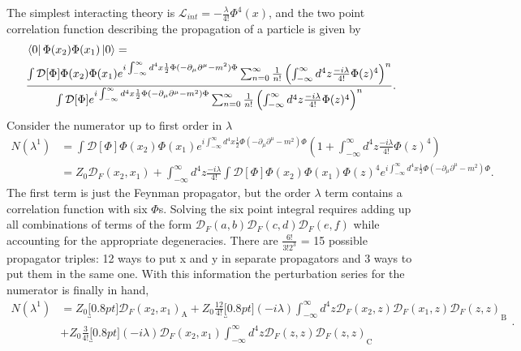 \documentclass[12pt]{article}
\begin{document}
The simplest interacting theory is $\mathcal{L}_{int} = -\frac{\lambda}{4!}\Phi^4(x)$, and the two point correlation function describing the propagation of a particle is given by
\begin{equation}
\begin{split}
&\bra{0}\Phi(x_2)\Phi(x_1)\ket{0} = \\ 
& \frac{\int \mathcal{D}[\Phi]\Phi(x_2)\Phi(x_1)
e^{i\int_{-\infty}^{\infty} d^4x \frac{1}{2}\Phi (-\partial_\mu\partial^\mu - m^2)\Phi} \sum_{n=0}^{\infty} \frac{1}{n!}\left(\int_{-\infty}^{\infty} d^4z \frac{-i\lambda}{4!}\Phi(z)^4\right)^n}
{\int \mathcal{D}[\Phi]e^{i\int_{-\infty}^{\infty} d^4x \frac{1}{2}\Phi (-\partial_\mu\partial^\mu - m^2)\Phi} \sum_{n=0}^{\infty} \frac{1}{n!}\left(\int_{-\infty}^{\infty} d^4z \frac{-i\lambda}{4!}\Phi(z)^4 \right)^n }.
\end{split}
\end{equation}
Consider the numerator up to first order in $\lambda$
\begin{equation}
\begin{split}
N(\lambda^1) &= \int \mathcal{D}[\Phi]\Phi(x_2)\Phi(x_1)
e^{i\int_{-\infty}^{\infty} d^4x \frac{1}{2}\Phi (-\partial_\mu\partial^\mu - m^2)\Phi} \left(1 + \int_{-\infty}^{\infty} d^4z \frac{-i\lambda}{4!}\Phi(z)^4\right) \\
&=  Z_0\mathcal{D}_F(x_2,x_1) +  
\int_{-\infty}^{\infty} d^4z \frac{-i\lambda}{4!} \int \mathcal{D}[\Phi]\Phi(x_2)\Phi(x_1)\Phi(z)^4e^{i\int_{-\infty}^{\infty} d^4x \frac{1}{2}\Phi (-\partial_\mu\partial^\mu - m^2)\Phi}.
\end{split}
\end{equation}
The first term is just the Feynman propagator, but the order $\lambda$ term contains a correlation function with six $\Phi$s. Solving the six point integral requires adding up all combinations of terms of the form $\mathcal{D}_F(a,b) \mathcal{D}_F(c,d) \mathcal{D}_F(e,f)$ while accounting for the appropriate degeneracies. There are $\frac{6!}{3!2^3}$ = 15 possible propagator triples: 12 ways to put x and y in separate propagators and 3 ways to put them in the same one. With this information the perturbation series for the numerator is finally in hand, 
\begin{equation}
\begin{split}
N(\lambda^1) &= Z_0\underbracket[0.8pt]{\mathcal{D}_F(x_2,x_1)}_\text{A} 
+ Z_0\frac{12}{4!} \underbracket[0.8pt]{(-i\lambda)\int_{-\infty}^{\infty} d^4z \mathcal{D}_F(x_2,z) \mathcal{D}_F(x_1,z) \mathcal{D}_F(z,z)}_\text{B} \\ 
&+ Z_0\frac{3}{4!}\underbracket[0.8pt]{(-i\lambda)\mathcal{D}_F(x_2,x_1) \int_{-\infty}^{\infty} d^4z \mathcal{D}_F(z,z) \mathcal{D}_F(z,z)}_\text{C} 
\end{split}.
\end{equation} 
\end{document}
